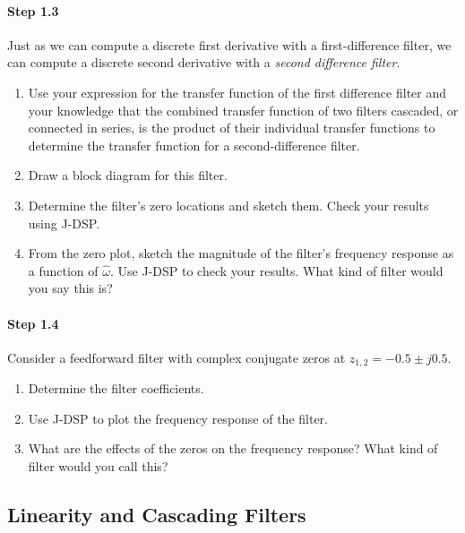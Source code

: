\paragraph{Step 1.3} Just as we can compute a discrete first
derivative with a first-difference filter, we can compute a discrete
second derivative with a \emph{second difference filter}.

\begin{enumerate}\renewcommand{\theenumi}{\alph{enumi}}
\item Use your expression for the transfer function of the first
	  difference filter and your knowledge that the combined transfer
	  function of two filters cascaded, or connected in series, is the
	  product of their individual transfer functions to determine the
	  transfer function for a second-difference filter.


\item Draw a block diagram for this filter.
	

\item Determine the filter's zero locations and sketch them. Check
	  your results using J-DSP.
	  
	  

\item From the zero plot, sketch the magnitude of the filter's
	  frequency response as a function of $\hat{\omega}$. Use J-DSP to
	  check your results. What kind of filter would you say this is?


\end{enumerate}


\paragraph{Step 1.4} Consider a feedforward filter with complex
conjugate zeros at $z_{1,2} = -0.5 \pm j 0.5$.

\begin{enumerate}\renewcommand{\theenumi}{\alph{enumi}}
\item Determine the filter coefficients.


\item Use J-DSP to plot the frequency response of the filter.

\item What are the effects of the zeros on the frequency response?
	  What kind of filter would you call this?

\end{enumerate}

\subsection{Linearity and Cascading Filters}

